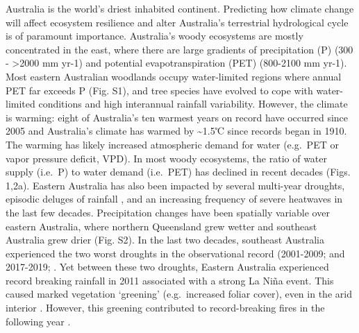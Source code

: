 \documentclass[gc, manuscript]{copernicus}
\begin{document}


\introduction[Introduction]

Australia is the world's driest inhabited continent. Predicting how
climate change will affect ecosystem resilience and alter Australia's
terrestrial hydrological cycle is of paramount importance. Australia's
woody ecosystems are mostly concentrated in the east, where there are
large gradients of precipitation (P) (300 - \textgreater2000 mm yr-1)
and potential evapotranspiration (PET) (800-2100 mm yr-1). Most eastern
Australian woodlands occupy water-limited regions where annual PET far
exceeds P (Fig. S1), and tree species have evolved to cope with
water-limited conditions \citep{petersLivingEdgeContinentalscale2021}
and high interannual rainfall variability. However, the climate is
warming: eight of Australia's ten warmest years on record have occurred
since 2005 \citep{csiroStateClimate20202020} and Australia's climate has
warmed by \textasciitilde1.5℃ since records began in 1910. The warming
has likely increased atmospheric demand for water (e.g.~PET or vapor
pressure deficit, VPD). In most woody ecosystems, the ratio of water
supply (i.e.~P) to water demand (i.e.~PET) has declined in recent
decades (Figs. 1,2a). Eastern Australia has also been impacted by
several multi-year droughts, episodic deluges of rainfall
\citep{kingRoleClimateVariability2020b}, and an increasing frequency of
severe heatwaves \citep{perkinsIncreasingFrequencyIntensity2012a} in the
last few decades. Precipitation changes have been spatially variable
over eastern Australia, where northern Queensland grew wetter and
southeast Australia grew drier (Fig. S2). In the last two decades,
southeast Australia experienced the two worst droughts in the
observational record (2001-2009;
\citet{vandijkMillenniumDroughtSoutheast2013d} and 2017-2019;
\citep{bureauofmeteorologyAnnualAustralianClimate}. Yet between these
two droughts, Eastern Australia experienced record breaking rainfall in
2011 associated with a strong La Niña event. This caused marked
vegetation `greening' (e.g.~increased foliar cover), even in the arid
interior
\citep{bastosGlobalNPPDependence2013a, poulterContributionSemiaridEcosystems2014, ahlstromDominantRoleSemiarid2015a}.
However, this greening contributed to record-breaking fires in the
following year \citep{harrisBiologicalResponsesPress2018b}.
\end{document}
